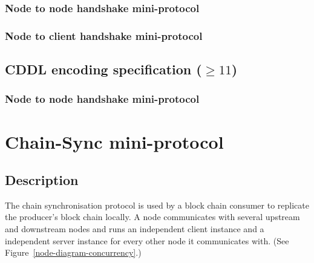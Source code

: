 \subsubsection{Node to node handshake mini-protocol}

\subsubsection{Node to client handshake mini-protocol}


\subsection{CDDL encoding specification ($\geq 11$)}\label{handshake-cddl}

\subsubsection{Node to node handshake mini-protocol}


\section{Chain-Sync mini-protocol}
\label{chain-sync-protocol}
\newcommand{\StCanAwait}{\state{StCanAwait}}
\newcommand{\StMustReply}{\state{StMustReply}}
\newcommand{\StIntersect}{\state{StIntersect}}
\newcommand{\MsgRequestNext}{\msg{MsgRequestNext}}
\newcommand{\MsgAwaitReply}{\msg{MsgAwaitReply}}
\newcommand{\MsgRollForward}{\msg{MsgRollForward}}
\newcommand{\MsgRollBackward}{\msg{MsgRollBackward}}
\newcommand{\MsgFindIntersect}{\msg{MsgFindIntersect}}
\newcommand{\MsgIntersectFound}{\msg{MsgIntersectFound}}
\newcommand{\MsgIntersectNotFound}{\msg{MsgIntersectNotFound}}

\subsection{Description}
The chain synchronisation protocol is used by a block chain consumer
to replicate the producer's block chain locally.
A node communicates with several upstream and downstream nodes
and runs an independent client instance and a independent server instance for every
other node it communicates with.
(See Figure~\ref{node-diagram-concurrency}.)

